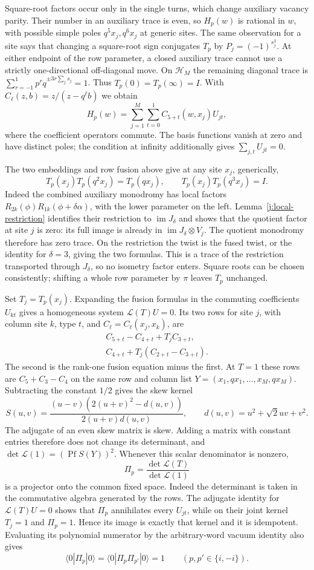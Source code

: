 Square-root factors occur only in the single turns, which change
auxiliary vacancy parity. Their number in an auxiliary trace is even,
so $H_p(w)$ is rational in $w$, with possible simple poles
$q^5x_j,q^6x_j$ at generic sites. The same observation for a site says
that changing a square-root sign conjugates $T_p$ by
$P_j=(-1)^{s_j^2}$. At either endpoint of the row parameter, a closed
auxiliary trace cannot use a strictly one-directional off-diagonal
move. On $\mathcal H_M$ the remaining diagonal trace is
$\sum_{r=-1}^1p^r q^{\pm3r\sum_j s_j}=1$. Thus
$T_p(0)=T_p(\infty)=I$. With $C_\ell(z,b)=z/(z-q^\ell b)$ we obtain
\[
H_p(w)=\sum_{j=1}^M\sum_{t=0}^1 C_{5+t}(w,x_j) U_{jt},
\]
where the coefficient operators commute. The basis functions vanish at
zero and have distinct poles; the condition at infinity additionally
gives $\sum_{j,t}U_{jt}=0$.

The two embeddings and row fusion above give at any site $x_j$, generically,
\[
T_p(x_j)T_p(q^2x_j)=T_p(qx_j),\qquad T_p(x_j)T_p(q^3x_j)=I.
\]
Indeed the combined auxiliary monodromy has local factors
$R_{2k}(\phi)R_{1k}(\phi+\delta\alpha)$, with the lower parameter on
the left. Lemma~\ref{j:local-restriction} identifies their restriction
to $\operatorname{im}J_\delta$ and shows that the quotient factor at
site $j$ is zero: its full image is already in
$\operatorname{im}J_\delta\otimes V_j$. The quotient monodromy therefore
has zero trace. On the restriction the twist is the fused twist, or the
identity for $\delta=3$, giving the two formulas. This is a trace of
the restriction transported through $J_\delta$, so no isometry factor
enters. Square roots can be chosen consistently; shifting a whole row
parameter by $\pi$ leaves $T_p$ unchanged.

Set $T_j=T_p(x_j)$. Expanding the fusion formulas in the commuting
coefficients $U_{kt}$ gives a homogeneous system $\mathcal L(T)U=0$.
Its two rows for site $j$, with column site $k$, type $t$, and
$C_\ell=C_\ell(x_j,x_k)$, are
\[
\begin{split}
 C_{5+t}-C_{4+t}+T_j C_{3+t},\\
 C_{4+t}+T_j(C_{2+t}-C_{3+t}).
 \end{split}
\]
The second is the rank-one fusion equation minus the first. At $T=1$
these rows are $C_5+C_3-C_4$ on the same row and column list
$Y=(x_1,q x_1,\ldots,x_M,q x_M)$. Subtracting the constant $1/2$ gives
the skew kernel
\[
S(u,v)=\frac{(u-v)(2(u+v)^2-d(u,v))}{2(u+v)d(u,v)},\qquad d(u,v)=u^2+\sqrt2uv+v^2.
\]
The adjugate of an even skew matrix is skew. Adding a matrix with
constant entries therefore does not change its determinant, and
$\det\mathcal L(1)=(\operatorname{Pf}S(Y))^2$. Whenever this scalar
denominator is nonzero,
\[
\Pi_p=\frac{\det\mathcal L(T)}{\det\mathcal L(1)}
\]
is a projector onto the common fixed space. Indeed the determinant is
taken in the commutative algebra generated by the rows. The adjugate
identity for $\mathcal L(T)U=0$ shows that $\Pi_p$ annihilates every
$U_{jt}$, while on their joint kernel $T_j=1$ and $\Pi_p=1$. Hence its
image is exactly that kernel and it is idempotent. Evaluating its
polynomial numerator by the arbitrary-word vacuum identity also gives
\[
\langle0|\Pi_p|0\rangle
 =\langle0|\Pi_p\Pi_{p'}|0\rangle=1
\qquad(p,p'\in\{i,-i\}).
\]

